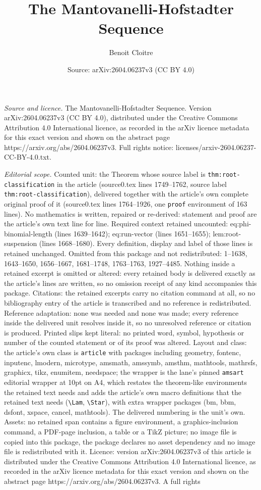 \documentclass[10pt,a4paper]{amsart}
\title[The Mantovanelli-Hofstadter Sequence]{The Mantovanelli-Hofstadter Sequence}
\author{Benoit Cloitre}
\date{Source: arXiv:2604.06237v3 (CC BY 4.0)}
\begin{document}
\maketitle

\noindent\emph{Source and licence.} The Mantovanelli-Hofstadter Sequence. Version arXiv:2604.06237v3 (CC BY 4.0), distributed under the Creative Commons Attribution 4.0 International licence, as recorded in the arXiv licence metadata for this exact version and shown on the abstract page https://arxiv.org/abs/2604.06237v3. Full rights notice: licenses/arxiv-2604.06237-CC-BY-4.0.txt.\par\smallskip

\noindent\textit{Editorial scope.} Counted unit: the Theorem whose source label is \texttt{thm:root-classification} in the article (source0.tex lines 1749--1762, source label \texttt{thm:root-classification}), delivered together with the article's own complete original proof of it (source0.tex lines 1764--1926, one \texttt{proof} environment of 163 lines). No mathematics is written, repaired or re-derived: statement and proof are the article's own text line for line. Required context retained uncounted: eq:phi-binomial-length (lines 1639--1642); eq:run-vector (lines 1651--1655); lem:root-suspension (lines 1668--1680). Every definition, display and label of those lines is retained unchanged. Omitted from this package and not redistributed: 1--1638, 1643--1650, 1656--1667, 1681--1748, 1763--1763, 1927--4485. Nothing inside a retained excerpt is omitted or altered: every retained body is delivered exactly as the article's lines are written, so no omission receipt of any kind accompanies this package. Citations: the retained excerpts carry no citation command at all, so no bibliography entry of the article is transcribed and no reference is redistributed. Reference adaptation: none was needed and none was made; every reference inside the delivered unit resolves inside it, so no unresolved reference or citation is produced. Printed slips kept literal: no printed word, symbol, hypothesis or number of the counted statement or of its proof was altered. Layout and class: the article's own class is \texttt{article} with packages including geometry, fontenc, inputenc, lmodern, microtype, amsmath, amssymb, amsthm, mathtools, mathrsfs, graphicx, tikz, enumitem, needspace; the wrapper is the lane's pinned \texttt{amsart} editorial wrapper at 10pt on A4, which restates the theorem-like environments the retained text needs and adds the article's own macro definitions that the retained text needs (\texttt{\textbackslash Lam}, \texttt{\textbackslash Star}), with extra wrapper packages (bm, bbm, dsfont, xspace, cancel, mathtools). The delivered numbering is the unit's own. Assets: no retained span contains a figure environment, a graphics-inclusion command, a PDF-page inclusion, a table or a TikZ picture; no image file is copied into this package, the package declares no asset dependency and no image file is redistributed with it. Licence: version arXiv:2604.06237v3 of this article is distributed under the Creative Commons Attribution 4.0 International licence, as recorded in the arXiv licence metadata for this exact version and shown on the abstract page https://arxiv.org/abs/2604.06237v3. A full rights 
\end{document}
